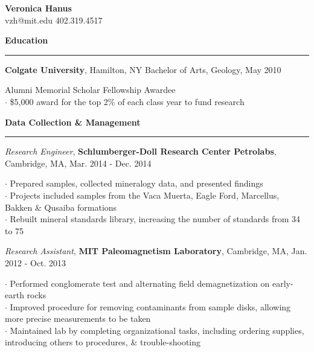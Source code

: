 \documentclass[10pt]{article}
\begin{document}
\bigskip
\begin{flushleft}
\LARGE{\textbf{Veronica Hanus}}\\
\large{vzh@mit.edu} \hspace*{0.002in} \normalsize{402.319.4517}\\
\end{flushleft}
\smallskip

\vspace*{0.25 mm}
\textbf{Education}
\smallskip
\hrule 
\textbf{Colgate University}, Hamilton, NY\hspace*{2.5 in} 	Bachelor of Arts, Geology, May 2010\\	
\begin{small}Alumni Memorial Scholar Fellowship Awardee\\
	$\cdot$ {\$5,000 award for the top 2\% of each class year to fund research}\end{small}

\vspace*{0.25 mm}
\textbf{Data Collection \& Management}
\smallskip
\hrule
\emph{Research Engineer}, \textbf {Schlumberger-Doll Research Center Petrolabs}, Cambridge, MA, Mar. 2014 - Dec. 2014 \\ 
\begin{small}$\cdot$ {Prepared samples, collected mineralogy data, and presented findings}\\ 
$\cdot$ {Projects included samples from the Vaca Muerta, Eagle Ford, Marcellus, Bakken \& Qusaiba  formations}\\
$\cdot$ {Rebuilt mineral standards library, increasing the number of standards from 34 to 75}\end{small} 

\smallskip
\emph {Research Assistant}, \textbf {MIT Paleomagnetism Laboratory}, Cambridge, MA, Jan. 2012 - Oct. 2013 \\ 
\begin{small}$\cdot$ {Performed conglomerate test and alternating field demagnetization on early-earth rocks} \\ 
$\cdot$ {Improved procedure for removing contaminants from sample disks, allowing more precise measurements to be taken} \\
$\cdot$ {Maintained lab by completing organizational tasks, including ordering supplies, introducing others to procedures, \& trouble-shooting}\end{small}
\end{document}

